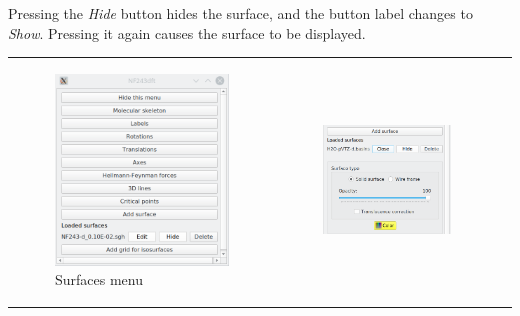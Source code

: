 \documentclass[10pt]{article}
\begin{document}
Pressing the {\it Hide} button hides the surface, and the button label changes to {\it Show}.
Pressing it again causes the surface to be displayed.


\vspace*{5mm}
\hspace*{-5mm}
\begin{tabular}{lcr}
\begin{minipage}{.3\linewidth}
    \begin{figure}[H]
        \begin{center}
            \includegraphics[width=0.8\linewidth]{damqt320_surfaces_menu.png}
        \end{center}
        \vspace*{7mm}
        \caption{Surfaces menu \label{fig:4_13_9_1}}
    \end{figure}
\end{minipage}
&
\begin{minipage}{.3\linewidth}
    \begin{figure}[H]
        \begin{center}
            \includegraphics[width=0.85\linewidth]{damqt320_basins_menu.png}

\end{center}
\end{figure}
\end{minipage}
\end{tabular}
\end{document}
